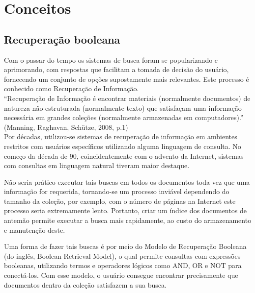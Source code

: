 \chapter{Conceitos}
\label{cap:conceitos}


\section{Recuperação booleana}
\label{sec:recuperacao_booleana}

Com o passar do tempo os sistemas de busca foram se popularizando e aprimorando, com respostas que facilitam a tomada de decisão do usuário, fornecendo um conjunto de opções supostamente mais relevantes. Este processo é conhecido como Recuperação de Informação. \\

“Recuperação de Informação é encontrar materiais (normalmente documentos) de natureza não-estruturada (normalmente texto) que satisfaçam uma informação necessária em grandes coleções (normalmente armazenadas em computadores).” (Manning, Raghavan, Schütze, 2008, p.1) \\

Por décadas, utilizou-se sistemas de recuperação de informação em ambientes restritos com usuários específicos utilizando alguma linguagem de consulta. No começo da década de 90, coincidentemente com o advento da Internet, sistemas com consultas em linguagem natural tiveram maior destaque.

Não seria prático executar tais buscas em todos os documentos toda vez que uma informação for requerida, tornando-se um processo inviável dependendo do tamanho da coleção, por exemplo, com o número de páginas na Internet este processo seria extremamente lento. Portanto, criar um índice dos documentos de antemão permite executar a busca mais rapidamente, ao custo do armazenamento e manutenção deste.

Uma forma de fazer tais buscas é por meio do Modelo de Recuperação Booleana (do inglês, Boolean Retrieval Model), o qual permite consultas com expressões booleanas, utilizando termos e operadores lógicos como AND, OR e NOT para conectá-los. Com esse modelo, o usuário consegue encontrar precisamente que documentos dentro da coleção satisfazem a sua busca. 

